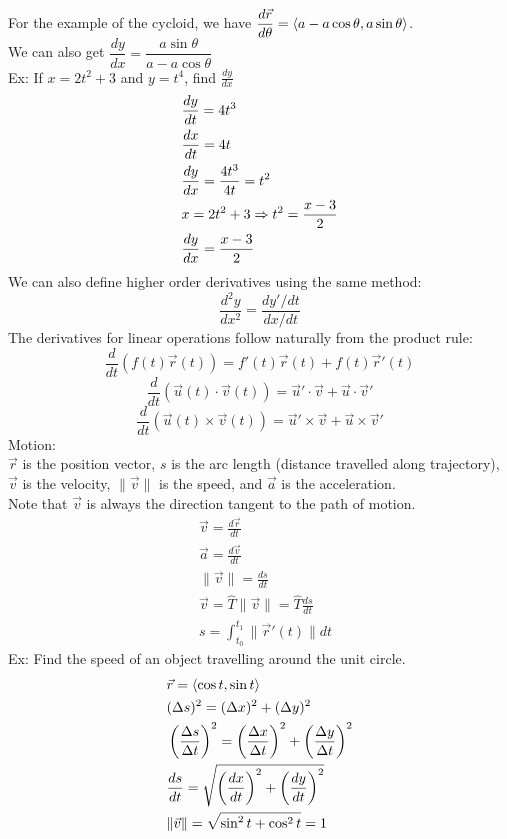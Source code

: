 \documentclass[11pt, fleqn]{article}
\begin{document}
For the example of the cycloid, we have $\dfrac{d\vec{r}}{d\theta}=\left\langle a-a\cos\theta,a\sin\theta \right\rangle$.\\
We can also get $\dfrac{dy}{dx}=\dfrac{a\sin\theta}{a-a\cos\theta}$\\
Ex: If $x=2t^2+3$ and $y=t^4$, find $\frac{dy}{dx}$
\begin{align*}
    &\frac{dy}{dt}=4t^3\\
    &\frac{dx}{dt}=4t\\
    &\frac{dy}{dx}=\frac{4t^3}{4t}=t^2\\
    &x=2t^2+3\Rightarrow t^2=\frac{x-3}{2}\\
    &\frac{dy}{dx}=\frac{x-3}{2}
\end{align*}
We can also define higher order derivatives using the same method:
$$\frac{d^2y}{dx^2}=\frac{dy'/dt}{dx/dt}$$
The derivatives for linear operations follow naturally from the product rule:
$$\frac{d}{dt}(f(t)\vec{r}(t))=f'(t)\vec{r}(t)+f(t)\vec{r}'(t)$$
$$\frac{d}{dt}(\vec{u}(t)\cdot\vec{v}(t))=\vec{u}'\cdot\vec{v}+\vec{u}\cdot\vec{v}'$$
$$\frac{d}{dt}(\vec{u}(t)\times\vec{v}(t))=\vec{u}'\times\vec{v}+\vec{u}\times\vec{v}'$$
Motion:\\
$\vec{r}$ is the position vector, $s$ is the arc length (distance travelled along trajectory), $\vec{v}$ is the velocity, $\|\vec{v}\|$ is the speed, and $\vec{a}$ is the acceleration.\\
Note that $\vec{v}$ is always the direction tangent to the path of motion.
\begin{align*}
    &\vec{v}=\frac{d\vec{r}}{dt}\\
    &\vec{a}=\frac{d\vec{v}}{dt}\\
    &\|\vec{v}\|=\frac{ds}{dt}\\
    &\vec{v}=\hat{T}\|\vec{v}\|=\hat{T}\frac{ds}{dt}\\
    &s=\int_{t_0}^{t_1}\|\vec{r}'(t)\|dt
\end{align*}
Ex: Find the speed of an object travelling around the unit circle.
\begin{align*}
    &\vec{r}=\left\langle \cos t,\sin t \right\rangle\\
    &(\Delta s)^2=(\Delta x)^2+(\Delta y)^2\\
    &\left( \frac{\Delta s}{\Delta t} \right)^2=\left( \frac{\Delta x}{\Delta t} \right)^2+\left( \frac{\Delta y}{\Delta t} \right)^2\\
    &\frac{ds}{dt}=\sqrt{\left( \frac{dx}{dt} \right)^2+\left( \frac{dy}{dt} \right)^2}\\
    &\|\vec{v}\|=\sqrt{\sin^2 t+\cos^2 t}=1
\end{align*}
\end{document}
